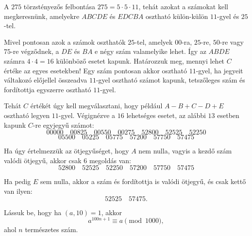 \begin{solution}
	A $275$ törzstényezős felbontása $275=5\cdot5\cdot11$, tehát azokat
	a számokat kell megkeresnünk, amelyekre $ABCDE$ és $EDCBA$ osztható
	külön-külön $11$-gyel és $25$-tel.
	
	Mivel pontosan azok a számok oszthatók $25$-tel, amelyek $00$-ra,
	$25$-re, $50$-re vagy $75$-re végződnek, a $DE$ és $BA$ e négy
	szám valamelyike lehet. Így az $ABDE$ számra $4\cdot4=16$ különböző
	esetet kapunk. Határozzuk meg, mennyi lehet $C$ értéke az egyes esetekben!
	Egy szám pontosan akkor osztható $11$-gyel, ha jegyeit váltakozó
	előjellel összeadva $11$-gyel osztható számot kapunk, tetszőleges
	szám és fordítottja egyszerre osztható $11$-gyel.
	
	Tehát $C$ értékét úgy kell megválasztani, hogy például $A-B+C-D+E$
	osztható legyen $11$-gyel. Végignézve a $16$ lehetséges esetet,
	az alábbi $13$ esetben kapunk $C$-re egyjegyű számot: 
	\[
	00000\quad00825\quad00550\quad00275\quad52800\quad52525\quad52250
	\]
	\[
	05500\quad05225\quad05775\quad57200\quad57750\quad57475
	\]
	
	Ha úgy értelmezzük az ötjegyűséget, hogy $A$ nem nulla, vagyis a
	kezdő szám valódi ötjegyű, akkor csak 6 megoldás van: 
	\[
	52800\quad52525\quad52250\quad57200\quad57750\quad57475
	\]
	
	Ha pedig $E$ sem nulla, akkor a szám és fordítottja is valódi ötjegyű,
	és csak kettő van ilyen: 
	\[
	52525\quad57475.
	\]
\end{solution}
\begin{extraproblem}
	Lássuk be, hogy ha $(a,10)=1$, akkor 
	\[
	a^{100n+1}\equiv a\pmod{1000},
	\]
	ahol $n$ természetes szám. 
\end{extraproblem}

